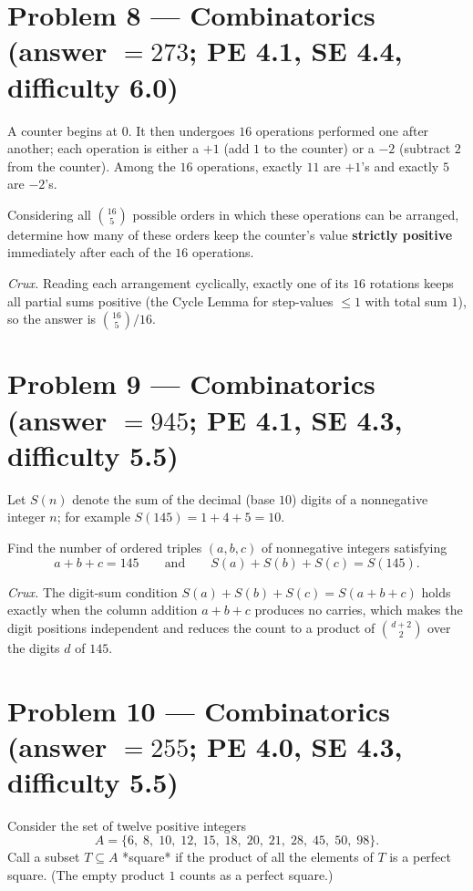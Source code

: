 \documentclass[11pt]{article}
\begin{document}
\section*{Problem 8 --- Combinatorics \quad (answer $=273$; PE 4.1, SE 4.4, difficulty 6.0)}

A counter begins at $0$. It then undergoes $16$ operations performed one after another; each operation is either a $+1$ (add $1$ to the counter) or a $-2$ (subtract $2$ from the counter). Among the $16$ operations, exactly $11$ are $+1$'s and exactly $5$ are $-2$'s.

Considering all $\binom{16}{5}$ possible orders in which these operations can be arranged, determine how many of these orders keep the counter's value \textbf{strictly positive} immediately after each of the $16$ operations.

\medskip

\textit{Crux.} Reading each arrangement cyclically, exactly one of its $16$ rotations keeps all partial sums positive (the Cycle Lemma for step-values $\le 1$ with total sum $1$), so the answer is $\binom{16}{5}/16$.

\section*{Problem 9 --- Combinatorics \quad (answer $=945$; PE 4.1, SE 4.3, difficulty 5.5)}

Let $S(n)$ denote the sum of the decimal (base $10$) digits of a nonnegative integer $n$; for example $S(145)=1+4+5=10$.

Find the number of ordered triples $(a,b,c)$ of nonnegative integers satisfying
$$a+b+c = 145 \qquad\text{and}\qquad S(a)+S(b)+S(c) = S(145).$$

\medskip

\textit{Crux.} The digit-sum condition $S(a)+S(b)+S(c)=S(a+b+c)$ holds exactly when the column addition $a+b+c$ produces no carries, which makes the digit positions independent and reduces the count to a product of $\binom{d+2}{2}$ over the digits $d$ of $145$.

\section*{Problem 10 --- Combinatorics \quad (answer $=255$; PE 4.0, SE 4.3, difficulty 5.5)}

Consider the set of twelve positive integers
$$A=\{6,\;8,\;10,\;12,\;15,\;18,\;20,\;21,\;28,\;45,\;50,\;98\}.$$
Call a subset $T\subseteq A$ *square* if the product of all the elements of $T$ is a perfect square. (The empty product $1$ counts as a perfect square.)
\end{document}
